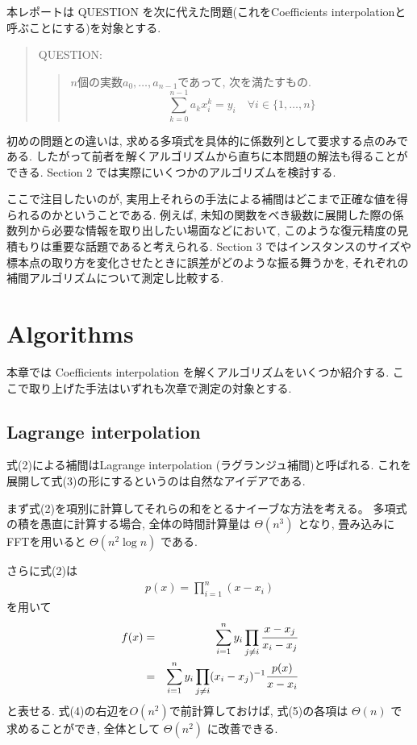\documentclass[uplatex,dvipdfmx,titlepage]{jsarticle}
\begin{document}
  本レポートは QUESTION を次に代えた問題(これをCoefficients interpolationと呼ぶことにする)を対象とする.
  \begin{quote}
    QUESTION:
    \begin{quote}
      $n$個の実数$a_0, \ldots, a_{n-1}$であって, 次を満たすもの.
      \begin{equation}
        \sum_{k=0}^{n-1} a_k x_i^k = y_i \quad \forall i \in \{1, \ldots, n\}
      \end{equation}
    \end{quote}
  \end{quote}
  初めの問題との違いは, 求める多項式を具体的に係数列として要求する点のみである.
  したがって前者を解くアルゴリズムから直ちに本問題の解法も得ることができる.
  Section 2 では実際にいくつかのアルゴリズムを検討する.

  ここで注目したいのが, 実用上それらの手法による補間はどこまで正確な値を得られるのかということである.
  例えば, 未知の関数をべき級数に展開した際の係数列から必要な情報を取り出したい場面などにおいて, このような復元精度の見積もりは重要な話題であると考えられる.
  Section 3 ではインスタンスのサイズや標本点の取り方を変化させたときに誤差がどのような振る舞うかを, それぞれの補間アルゴリズムについて測定し比較する.

  \section{Algorithms}
  本章では Coefficients interpolation を解くアルゴリズムをいくつか紹介する.
  ここで取り上げた手法はいずれも次章で測定の対象とする.

  \subsection{Lagrange interpolation}
  式(2)による補間はLagrange interpolation (ラグランジュ補間)と呼ばれる.
  これを展開して式(3)の形にするというのは自然なアイデアである.

  まず式(2)を項別に計算してそれらの和をとるナイーブな方法を考える。
  多項式の積を愚直に計算する場合, 全体の時間計算量は $\Theta(n^3)$ となり, 畳み込みにFFTを用いると $\Theta(n^2 \log n)$ である.

  さらに式(2)は
  \begin{eqnarray}
    p(x) = \prod_{i = 1}^n (x-x_i)
  \end{eqnarray}
  を用いて
  \begin{eqnarray}
    f(x) &=& \sum_{i=1}^n y_i\prod_{j\neq i} \cfrac{x-x_j}{x_i-x_j} \nonumber\\
    &=& \displaystyle\sum_{i=1}^n y_i \prod_{j\neq i}(x_i-x_j)^{-1} \cfrac{p(x)}{x-x_i}
  \end{eqnarray}
  と表せる.
  式(4)の右辺を$O(n^2)$で前計算しておけば, 式(5)の各項は $\Theta(n)$ で求めることができ, 全体として $\Theta(n^2)$ に改善できる.
\end{document}
